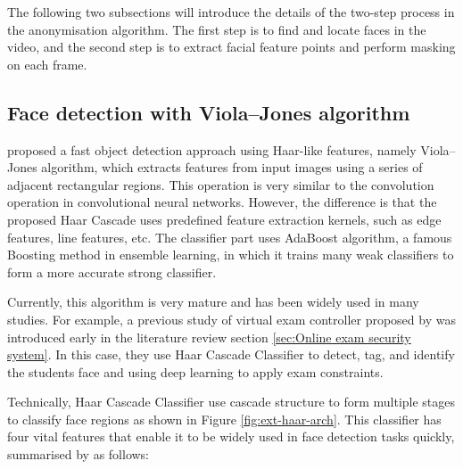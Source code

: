 The following two subsections will introduce the details of the two-step process in the anonymisation algorithm.
The first step is to find and locate faces in the video, and the second step is to extract facial feature points and perform masking on each frame.

\subsection{Face detection with Viola--Jones algorithm} %
\citet{viola2001rapid} proposed a fast object detection approach using Haar-like features, namely Viola--Jones algorithm, which extracts features from input images using a series of adjacent rectangular regions.
This operation is very similar to the convolution operation in convolutional neural networks.
However, the difference is that the proposed Haar Cascade uses predefined feature extraction kernels, such as edge features, line features, etc.
The classifier part uses AdaBoost algorithm, a famous Boosting method in ensemble learning, in which it trains many weak classifiers to form a more accurate strong classifier.

Currently, this algorithm is very mature and has been widely used in many studies.
For example, a previous study of virtual exam controller proposed by \citet{garg2020convolutional} was introduced early in the literature review section \ref{sec:Online exam security system}.
In this case, they use Haar Cascade Classifier to detect, tag, and identify the students face and using deep learning to apply exam constraints.

Technically, Haar Cascade Classifier use cascade structure to form multiple stages to classify face regions as shown in Figure \ref{fig:ext-haar-arch}.
This classifier has four vital features that enable it to be widely used in face detection tasks quickly, summarised by \citet{garg2020convolutional} as follows:

